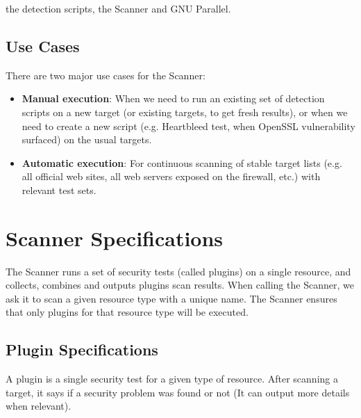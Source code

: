 the detection scripts, the Scanner and GNU Parallel. 




\subsection{Use Cases}
There are two major use cases for the Scanner:
\begin{itemize}
\item \textbf{Manual execution}: When we need to run an existing set of detection scripts on a new target (or existing targets, to get fresh results), or when we need to create a new script (e.g. Heartbleed test, when OpenSSL vulnerability surfaced) on the usual targets.
\item \textbf{Automatic execution}: For continuous scanning of stable target lists (e.g. all official web sites, all web servers exposed on the firewall, etc.) with relevant test sets.
\end{itemize}

\section{Scanner Specifications}
The Scanner runs a set of security tests (called plugins) on a single resource, and collects, combines and outputs plugins scan results. When calling the Scanner, we ask it to scan a given resource type with a unique name. The Scanner ensures that only plugins for that resource type will be executed. 

\subsection{Plugin Specifications}
A plugin is a single security test for a given type of resource. After scanning a target, it says if a security problem was found or not (It can output more details when relevant). 
